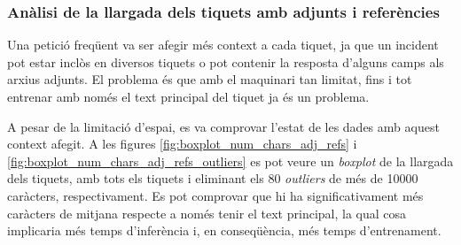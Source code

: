 \subsubsection{Anàlisi de la llargada dels tiquets amb adjunts i referències}
Una petició freqüent va ser afegir més context a cada tiquet, ja que un incident pot estar inclòs en diversos tiquets o pot contenir la resposta d'alguns camps als arxius adjunts. El problema és que amb el maquinari tan limitat, fins i tot entrenar amb només el text principal del tiquet ja és un problema.

A pesar de la limitació d'espai, es va comprovar l'estat de les dades amb aquest context afegit. A les figures \ref{fig:boxplot_num_chars_adj_refs} i \ref{fig:boxplot_num_chars_adj_refs_outliers} es pot veure un \textit{boxplot} de la llargada dels tiquets, amb tots els tiquets i eliminant els 80 \textit{outliers} de més de 10000 caràcters, respectivament. Es pot comprovar que hi ha significativament més caràcters de mitjana respecte a només tenir el text principal, la qual cosa implicaria més temps d'inferència i, en conseqüència, més temps d'entrenament.

